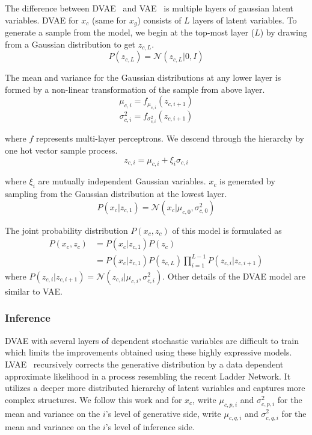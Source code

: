 \documentclass[10pt,twocolumn,letterpaper]{article}
\begin{document}
The difference between DVAE~\cite{rezende2014stochastic} and VAE~\cite{kingma2013auto} is multiple layers of gaussian latent variables. 
DVAE for $x_c$ (same for $x_g$) consists of $L$ layers of latent variables. To generate a sample from the model, we begin at the top-most 
layer ($L$) by drawing from a Gaussian distribution to get $z_{c,L}$. 
\begin{equation}
P(z_{c,L}) = \mathcal{N}(z_{c,L} | 0, I)
\end{equation}

The mean and variance for the Gaussian distributions at any lower layer is formed by a non-linear transformation of the sample from above layer. 
\begin{equation}
\mu_{c,i} = f_{\mu_{c,i}} (z_{c,i+1})
\end{equation}
\begin{equation}
\sigma_{c,i}^2 = f_{\sigma_{c,i}^2} (z_{c,i+1})
\end{equation}

where $f$ represents multi-layer perceptrons. We descend through the hierarchy by one hot vector sample process.
\begin{equation}
z_{c,i} = \mu_{c,i} + \xi_i \sigma_{c,i}
\end{equation}

where $\xi_i$ are mutually independent Gaussian variables. $x_c$ is generated by sampling from the Gaussian distribution at the lowest layer.
\begin{equation}
P(x_c|z_{c,1}) = \mathcal{N}(x_c|\mu_{c,0}, \sigma_{c,0}^2)
\end{equation}

The joint probability distribution $P(x_c, z_c)$ of this model is formulated as
\begin{equation}
\begin{split}
P (x_c, z_c) & = P(x_c|z_{c,1}) P(z_c) \\
& = P(x_c|z_{c,1}) P (z_{c,L}) \prod_{i=1}^{L-1} P (z_{c,i} | z_{c,i+1})
\end{split}
\end{equation}
where $P(z_{c,i} | z_{c,i+1}) = \mathcal{N} (z_{c,i} | \mu_{c,i}, \sigma_{c,i}^2) $. Other details of the DVAE model are similar to VAE. 

\subsubsection{Inference}
DVAE with several layers of dependent stochastic variables are difficult to train which limits the improvements obtained using these
highly expressive models. LVAE~\cite{sonderby2016ladder} recursively corrects the generative distribution by a data dependent approximate
likelihood in a process resembling the recent Ladder Network. It utilizes a deeper more distributed hierarchy of latent variables and captures more
complex structures. We follow this work and for $x_c$, write $\mu_{c,p,i}$ and $\sigma_{c,p,i}^2$ for the mean and variance on the $i$'s
level of generative side, write $\mu_{c,q,i}$ and $\sigma_{c,q,i}^2$ for the mean and variance on the $i$'s level of inference side. 
\end{document}
